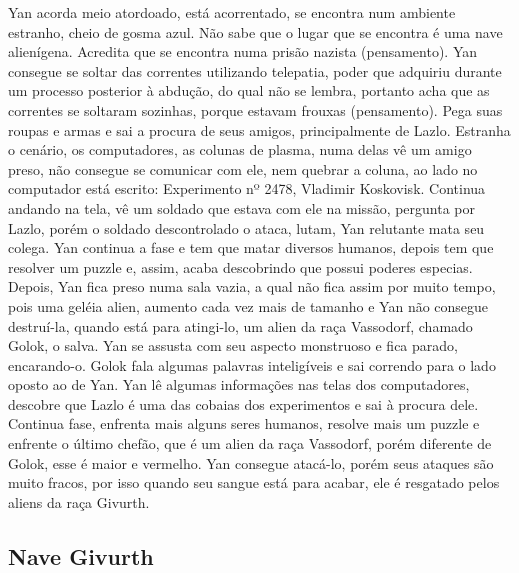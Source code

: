 \documentclass[12pt, a4paper]{article}
\begin{document}
	Yan acorda meio atordoado, está acorrentado, se encontra num 
    ambiente estranho, cheio de gosma azul. Não sabe que o lugar 
    que se encontra é uma nave alienígena. Acredita que se encontra
    numa prisão nazista (pensamento). Yan consegue se soltar das 
    correntes utilizando telepatia, poder que adquiriu durante um 
    processo posterior à abdução, do qual não se lembra, portanto 
    acha que as correntes se soltaram sozinhas, porque estavam frouxas
    (pensamento). Pega suas roupas e armas e sai a procura de seus 
    amigos, principalmente de Lazlo.  Estranha o cenário, os 
    computadores, as colunas de plasma, numa delas vê um amigo preso,
    não consegue se comunicar com ele, nem quebrar a coluna, ao lado 
    no computador está escrito: Experimento nº 2478, Vladimir Koskovisk.
    Continua andando na tela, vê um soldado que estava com ele na missão,
    pergunta por Lazlo, porém o soldado descontrolado o ataca, lutam,
    Yan relutante mata seu colega. Yan continua a fase e tem que matar 
    diversos humanos, depois tem que resolver um puzzle e, assim, acaba 
    descobrindo que possui poderes especias. Depois, Yan fica preso numa 
    sala vazia, a qual não fica assim por muito tempo, pois uma geléia 
    alien, aumento cada vez mais de tamanho e Yan não consegue destruí-la,
    quando está para atingi-lo, um alien da raça Vassodorf, chamado
    Golok, o salva. Yan se assusta com seu aspecto monstruoso e fica 
    parado, encarando-o. Golok fala algumas palavras inteligíveis e 
    sai correndo para o lado oposto ao de Yan.  Yan lê algumas 
    informações nas telas dos computadores, descobre que Lazlo é uma
    das cobaias dos experimentos e sai à procura dele. Continua fase,
    enfrenta mais alguns seres humanos, resolve mais um puzzle e 
    enfrente o último chefão, que é um alien da raça Vassodorf, porém 
    diferente de Golok, esse é maior e vermelho. Yan consegue atacá-lo,
    porém seus ataques são muito fracos, por isso quando seu sangue está
    para acabar, ele é resgatado pelos aliens da raça Givurth.

	\subsection{Nave Givurth}
\end{document}
